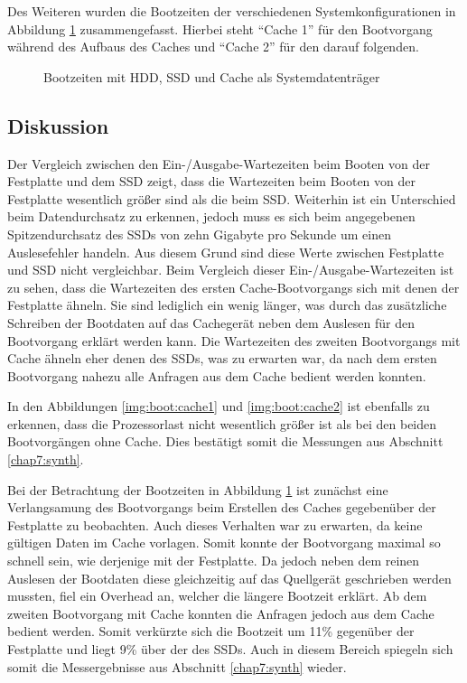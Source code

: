 Des Weiteren wurden die Bootzeiten der verschiedenen Systemkonfigurationen in Abbildung \ref{img:boot:boot} zusammengefasst. Hierbei steht "`Cache 1"' für den
Bootvorgang während des Aufbaus des Caches und "`Cache 2"' für den darauf folgenden.

\begin{figure}[H]\centering
    \caption{Bootzeiten mit HDD, SSD und Cache als Systemdatenträger}
    \label{img:boot:boot}
\end{figure}

\subsection{Diskussion}

Der Vergleich zwischen den Ein-/Ausgabe-Wartezeiten beim Booten von der Festplatte und dem \ac{SSD} zeigt, dass die Wartezeiten beim Booten von der Festplatte
wesentlich größer sind als die beim \ac{SSD}. Weiterhin ist ein Unterschied beim Datendurchsatz zu erkennen, jedoch muss es sich beim angegebenen
Spitzendurchsatz des \ac{SSD}s von zehn Gigabyte pro Sekunde um einen Auslesefehler handeln. Aus diesem Grund sind diese Werte zwischen Festplatte und \ac{SSD}
nicht vergleichbar. Beim Vergleich dieser Ein-/Ausgabe-Wartezeiten ist zu sehen, dass die Wartezeiten des ersten Cache-Bootvorgangs sich mit denen der
Festplatte ähneln. Sie sind lediglich ein wenig länger, was durch das zusätzliche Schreiben der Bootdaten auf das Cachegerät neben dem Auslesen für den
Bootvorgang erklärt werden kann. Die Wartezeiten des zweiten Bootvorgangs mit Cache ähneln eher denen des \ac{SSD}s, was zu erwarten war, da nach dem ersten
Bootvorgang nahezu alle Anfragen aus dem Cache bedient werden konnten.

In den Abbildungen \ref{img:boot:cache1} und \ref{img:boot:cache2} ist ebenfalls zu erkennen, dass die Prozessorlast nicht wesentlich größer ist als bei den
beiden Bootvorgängen ohne Cache. Dies bestätigt somit die Messungen aus Abschnitt \ref{chap7:synth}.

Bei der Betrachtung der Bootzeiten in Abbildung \ref{img:boot:boot} ist zunächst eine Verlangsamung des Bootvorgangs beim Erstellen des Caches gegebenüber der
Festplatte zu beobachten. Auch dieses Verhalten war zu erwarten, da keine gültigen Daten im Cache vorlagen. Somit konnte der Bootvorgang maximal so schnell
sein, wie derjenige mit der Festplatte. Da jedoch neben dem reinen Auslesen der Bootdaten diese gleichzeitig auf das Quellgerät
geschrieben werden mussten, fiel ein Overhead an, welcher die längere Bootzeit erklärt. Ab dem zweiten Bootvorgang mit Cache konnten die Anfragen jedoch aus
dem Cache bedient werden. Somit verkürzte sich die Bootzeit um 11\% gegenüber der Festplatte und liegt 9\% über der des \ac{SSD}s. Auch in diesem Bereich
spiegeln sich somit die Messergebnisse aus Abschnitt \ref{chap7:synth} wieder.

